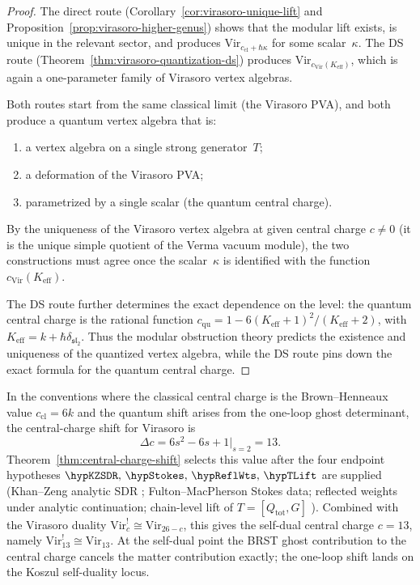 \begin{proof}
The direct route (Corollary~\ref{cor:virasoro-unique-lift} and
Proposition~\ref{prop:virasoro-higher-genus}) shows that the modular
lift exists, is unique in the relevant sector, and produces
$\mathrm{Vir}_{c_{\mathrm{cl}}+\hbar\kappa}$ for some scalar~$\kappa$.
The DS route (Theorem~\ref{thm:virasoro-quantization-ds}) produces
$\mathrm{Vir}_{c_{\mathrm{Vir}}(K_{\mathrm{eff}})}$, which is again a
one-parameter family of Virasoro vertex algebras.

Both routes start from the same classical limit (the Virasoro PVA), and
both produce a quantum vertex algebra that is:
\begin{enumerate}[leftmargin=2.4em]
\item a vertex algebra on a single strong generator~$T$;
\item a deformation of the Virasoro PVA;
\item parametrized by a single scalar (the quantum central charge).
\end{enumerate}
By the uniqueness of the Virasoro vertex algebra at given central charge
$c\neq 0$ (it is the unique simple quotient of the Verma vacuum module),
the two constructions must agree once the scalar~$\kappa$ is identified
with the function $c_{\mathrm{Vir}}(K_{\mathrm{eff}})$.

The DS route further determines the exact dependence on the level: the
quantum central charge is the rational function
$c_{\mathrm{qu}} = 1 - 6(K_{\mathrm{eff}}+1)^2/(K_{\mathrm{eff}}+2)$,
with $K_{\mathrm{eff}} = k + \hbar\delta_{\mathfrak{sl}_2}$. Thus
the modular obstruction theory predicts the existence and uniqueness
of the quantized vertex algebra, while the DS route pins down the exact
formula for the quantum central charge.
\end{proof}

\begin{remark}[The shift $\Delta c = 13$;
\ClaimStatusConditional{} on
$\hypKZSDR,\,\hypStokes,\,\hypReflWts,\,\hypTLift$]
\label{rem:virasoro-shift-13}
In the conventions where the classical central charge is the
Brown--Henneaux value $c_{\mathrm{cl}} = 6k$ and the quantum shift
arises from the one-loop ghost determinant, the central-charge shift
for Virasoro is
\[
\Delta c = 6s^2 - 6s + 1\big|_{s=2} = 13.
\]
Theorem~\ref{thm:central-charge-shift} selects this value after the four
endpoint hypotheses
$\hypKZSDR,\,\hypStokes,\,\hypReflWts,\,\hypTLift$ are supplied
(Khan--Zeng analytic SDR \cite{KZ25}; Fulton--MacPherson Stokes data;
reflected weights under analytic continuation; chain-level lift of
$T = [Q_{\mathrm{tot}}, G]$ \cite{Costello2011Renorm,CG17,LurieHA}).
Combined with the Virasoro duality
$\mathrm{Vir}_c^! \cong \mathrm{Vir}_{26-c}$, this gives the
self-dual central charge $c=13$, namely $\mathrm{Vir}_{13}^! \cong
\mathrm{Vir}_{13}$. At the self-dual point the BRST ghost contribution to
the central charge cancels the matter contribution exactly; the
one-loop shift lands on the Koszul self-duality locus.
\end{remark}

